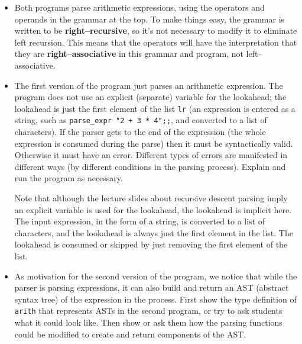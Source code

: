 \documentclass[12pt]{article}
\begin{document}
      \begin{itemize}

        \addtolength{\itemsep}{0mm}

        \item Both programs parse arithmetic expressions, using the
              operators and operands in the grammar at the top.  To make
              things easy, the grammar is written to be
              \textbf{right--recursive}, so it's not necessary to modify it
              to eliminate left recursion.  This means that the operators
              will have the interpretation that they are
              \textbf{right--associative} in this grammar and program, not
              left--associative.

        \item The first version of the program just parses an arithmetic
              expression.  The program does not use an explicit (separate)
              variable for the lookahead; the lookahead is just the first
              element of the list \texttt{lr} (an expression is entered as a
              string, such as \texttt{parse\_expr "2 + 3 * 4";;}, and
              converted to a list of characters).  If the parser gets to the
              end of the expression (the whole expression is consumed during
              the parse) then it must be syntactically valid.  Otherwise it
              must have an error.  Different types of errors are manifested
              in different ways (by different conditions in the parsing
              process).  Explain and run the program as necessary.

              Note that although the lecture slides about recursive descent
              parsing imply an explicit variable is used for the
              lookahead, the lookahead is implicit here.  The input
              expression, in the form of a string, is converted to a list of
              characters, and the lookahead is always just the first element
              in the list.  The lookahead is consumed or skipped by just
              removing the first element of the list.

        \item As motivation for the second version of the program, we notice
              that while the parser is parsing expressions, it can also
              build and return an AST (abstract syntax tree) of the
              expression in the process.  First show the type definition of
              \texttt{arith} that represents ASTs in the second program, or
              try to ask students what it could look like.  Then show or ask
              them how the parsing functions could be modified to create and
              return components of the AST.


\end{itemize}
\end{document}
